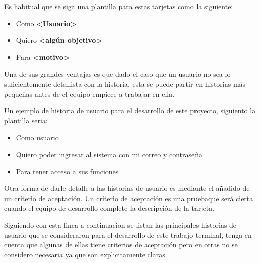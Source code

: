 Es habitual que se siga una plantilla para estas tarjetas como la siguiente:

\begin{itemize}
	\item Como \textbf{<Usuario>}
	\item Quiero \textbf{<algún objetivo>}
	\item Para \textbf{<motivo>}
\end{itemize}


Una de sus grandes ventajas es que dado el caso que un usuario no sea lo suficientemente detallista con la historia, esta se puede partir en historias más pequeñas antes de el equipo empiece a trabajar en ella.


Un ejemplo de historia de usuario para el desarrollo de este proyecto, siguiento la plantilla seria:



\begin{itemize}
	\item Como usuario
	\item Quiero poder ingresar al sistema con mi correo y contraseña
	\item Para tener acceso a sus funciones
\end{itemize}

Otra forma de darle detalle a las historias de usuario es mediante el añadido de un criterio de aceptación. Un criterio de aceptación es una pruebaque será cierta cuando el equipo de desarrollo complete la descripción de la tarjeta.


Siguiendo con esta linea a continuacion se listan las principales historias de usuario que se consideraron para el desarrollo de este trabajo terminal, tenga en cuenta que algunas de ellas tiene criterios de aceptación pero en otras no se considero necesaria ya que son explicitamente claras.


